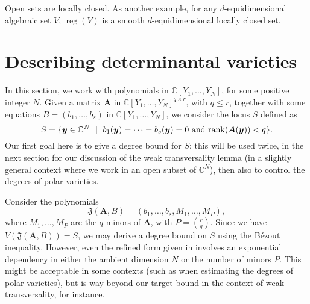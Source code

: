 \documentclass[12pt]{article}
\def\X{S}
\def\frkJ{\mathfrak{J}}
\def\yb{{\bm y}}
\DeclareMathOperator{\reg}{reg}
\def\C{\mathbb{C}}
\begin{document}
Open sets are locally closed. As another example, for any
$d$-equidimensional algebraic set $V$, $\reg(V)$ is a smooth
$d$-equidimensional locally closed set.


\section{Describing determinantal varieties}\label{ssec:detvar}

In this section, we work with polynomials in $\C[Y_1,\dots,Y_N]$, for
some positive integer $N$. Given a matrix $\bm A$ in
$\C[Y_1,\dots,Y_N]^{q \times r}$, with $q \le r$, together with some
equations $B=(b_1,\dots,b_s)$ in $\C[Y_1,\dots,Y_N]$, we consider the
locus $\X$ defined as 
\[\X = \{\yb \in \C^N \ \mid \ b_1(\yb) = \cdots = b_s(\yb) =0 
     \text{~and~} {\rm rank}(\bm A(\yb)) < q\}.\]
Our first goal here is to give a degree bound for $\X$; this will be
used twice, in the next section for our discussion of the weak
transversality lemma (in a slightly general context where we work in
an open subset of $\C^N$), then also to control the degrees of polar
varieties.

Consider the polynomials
\[\frkJ(\bm A, B) = (b_1,\dots,b_s,M_1,\dots,M_P),\]
where $M_1,\dots,M_P$ are the $q$-minors of $\bm A$, with $P={r \choose
q}$. Since we have $V(\frkJ(\bm A, B)) = \X$, we may derive a degree
bound on $\X$ using the B\'ezout inequality. However, even the refined
form given in \cite[Proposition 2.3]{Heintz1980} involves an
exponential dependency in either the ambient dimension $N$ or the
number of minors $P$. This might be acceptable in some contexts (such
as when estimating the degrees of polar varieties), but is way beyond
our target bound in the context of weak transversality, for instance.
\end{document}
